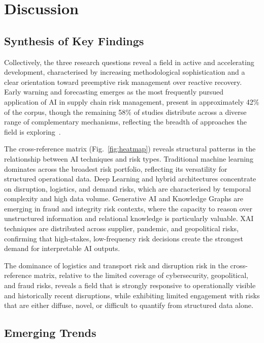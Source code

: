 \section{Discussion}

\subsection{Synthesis of Key Findings}

Collectively, the three research questions reveal a field in active and accelerating development, characterised by increasing methodological sophistication and a clear orientation toward preemptive risk management over reactive recovery. Early warning and forecasting emerges as the most frequently pursued application of AI in supply chain risk management, present in approximately 42\% of the corpus, though the remaining 58\% of studies distribute across a diverse range of complementary mechanisms, reflecting the breadth of approaches the field is exploring~\cite{deivaganesh2022future,li2025endtoend,farzhana2025hybrid}.

The cross-reference matrix (Fig.~\ref{fig:heatmap}) reveals structural patterns in the relationship between AI techniques and risk types. Traditional machine learning dominates across the broadest risk portfolio, reflecting its versatility for structured operational data. Deep Learning and hybrid architectures concentrate on disruption, logistics, and demand risks, which are characterised by temporal complexity and high data volume. Generative AI and Knowledge Graphs are emerging in fraud and integrity risk contexts, where the capacity to reason over unstructured information and relational knowledge is particularly valuable. XAI techniques are distributed across supplier, pandemic, and geopolitical risks, confirming that high-stakes, low-frequency risk decisions create the strongest demand for interpretable AI outputs.

The dominance of logistics and transport risk and disruption risk in the cross-reference matrix, relative to the limited coverage of cybersecurity, geopolitical, and fraud risks, reveals a field that is strongly responsive to operationally visible and historically recent disruptions, while exhibiting limited engagement with risks that are either diffuse, novel, or difficult to quantify from structured data alone.


\subsection{Emerging Trends}

